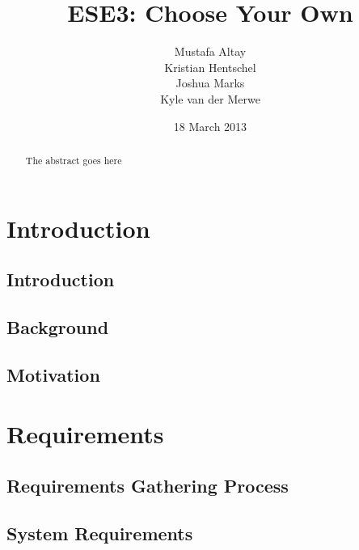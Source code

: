\documentclass{l3proj}
\begin{document}
\title{ESE3: Choose Your Own}
\author{Mustafa Altay\\
        Kristian Hentschel \\
        Joshua Marks \\
        Kyle van der Merwe}
\date{18 March 2013}
\maketitle
\begin{abstract}

The abstract goes here

\end{abstract}
\educationalconsent
\tableofcontents
\chapter{Introduction}
\label{intro}

\section{Introduction}


\section{Background}


\section{Motivation}


\chapter{Requirements}
\label{requirements}


\section{Requirements Gathering Process}
\label{sec:gathering}


\section{System Requirements}
\label{sec:system}

\end{document}
